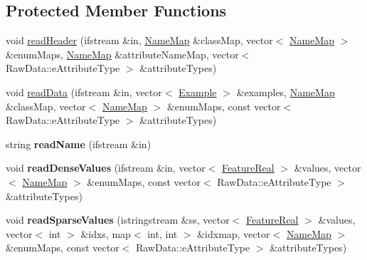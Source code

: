 \subsection*{Protected Member Functions}
\begin{DoxyCompactItemize}
\item 
void \hyperlink{classMultiBoost_1_1ArffParser_ab399500474366a998ceb56b49cd113eb}{read\-Header} (ifstream \&in, \hyperlink{classMultiBoost_1_1NameMap}{Name\-Map} \&class\-Map, vector$<$ \hyperlink{classMultiBoost_1_1NameMap}{Name\-Map} $>$ \&enum\-Maps, \hyperlink{classMultiBoost_1_1NameMap}{Name\-Map} \&attribute\-Name\-Map, vector$<$ Raw\-Data\-::e\-Attribute\-Type $>$ \&attribute\-Types)
\item 
void \hyperlink{classMultiBoost_1_1ArffParser_a80e003a25ae5b4201f0fbe490b396c25}{read\-Data} (ifstream \&in, vector$<$ \hyperlink{classMultiBoost_1_1Example}{Example} $>$ \&examples, \hyperlink{classMultiBoost_1_1NameMap}{Name\-Map} \&class\-Map, vector$<$ \hyperlink{classMultiBoost_1_1NameMap}{Name\-Map} $>$ \&enum\-Maps, const vector$<$ Raw\-Data\-::e\-Attribute\-Type $>$ \&attribute\-Types)
\item 
\hypertarget{classMultiBoost_1_1ArffParser_a73825cf1ad7c4dccebf7f0cc46428389}{string {\bfseries read\-Name} (ifstream \&in)}\label{classMultiBoost_1_1ArffParser_a73825cf1ad7c4dccebf7f0cc46428389}

\item 
\hypertarget{classMultiBoost_1_1ArffParser_a44a540ac1a0904fb75d38e59aa28aa4f}{void {\bfseries read\-Dense\-Values} (ifstream \&in, vector$<$ \hyperlink{Defaults_8h_a3a11cfe6a5d469d921716ca6291e934f}{Feature\-Real} $>$ \&values, vector$<$ \hyperlink{classMultiBoost_1_1NameMap}{Name\-Map} $>$ \&enum\-Maps, const vector$<$ Raw\-Data\-::e\-Attribute\-Type $>$ \&attribute\-Types)}\label{classMultiBoost_1_1ArffParser_a44a540ac1a0904fb75d38e59aa28aa4f}

\item 
\hypertarget{classMultiBoost_1_1ArffParser_a885ffe32985c6549d15ea6fb8a453e9b}{void {\bfseries read\-Sparse\-Values} (istringstream \&ss, vector$<$ \hyperlink{Defaults_8h_a3a11cfe6a5d469d921716ca6291e934f}{Feature\-Real} $>$ \&values, vector$<$ int $>$ \&idxs, map$<$ int, int $>$ \&idxmap, vector$<$ \hyperlink{classMultiBoost_1_1NameMap}{Name\-Map} $>$ \&enum\-Maps, const vector$<$ Raw\-Data\-::e\-Attribute\-Type $>$ \&attribute\-Types)}\label{classMultiBoost_1_1ArffParser_a885ffe32985c6549d15ea6fb8a453e9b}


\end{DoxyCompactItemize}
